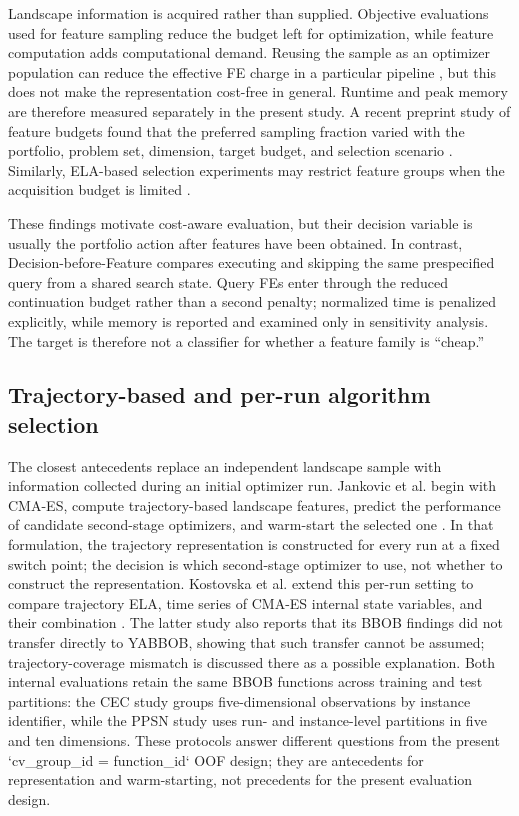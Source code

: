 Landscape information is acquired rather than supplied.  Objective evaluations
used for feature sampling reduce the budget left for optimization, while
feature computation adds computational demand.  Reusing the sample
as an optimizer population can reduce the effective FE charge in a particular
pipeline \cite{kerschkeAutomatedAlgorithmSelection2019}, but this does not make
the representation cost-free in general.  Runtime and peak memory are therefore
measured separately in the present study.  A recent preprint study of feature
budgets found
that the preferred sampling fraction varied with the portfolio, problem set,
dimension, target budget, and selection scenario
\cite{blomInfluenceFeatureComputation2026}.  Similarly, ELA-based selection
experiments may restrict feature groups when the acquisition budget is limited
\cite{guoAutomatedAlgorithmSelection2025}.

These findings motivate cost-aware evaluation, but their decision variable is
usually the portfolio action after features have been obtained.  In contrast,
Decision-before-Feature compares executing and skipping the same prespecified
query from a shared search state.  Query FEs enter through the reduced
continuation budget rather than a second penalty; normalized time is penalized
explicitly, while memory is reported and examined only in sensitivity analysis.
The target is therefore not a classifier for whether a feature family is
``cheap.''

\subsection{Trajectory-based and per-run algorithm selection}

The closest antecedents replace an independent landscape sample with
information collected during an initial optimizer run.  Jankovic et al. begin
with CMA-ES, compute trajectory-based landscape features, predict the
performance of candidate second-stage optimizers, and warm-start the selected
one \cite{jankovicTrajectorybasedAlgorithmSelection2022}.  In that formulation,
the trajectory representation is constructed for every run at a fixed switch
point; the decision is which second-stage optimizer to use, not whether to
construct the representation.  Kostovska et al.
extend this per-run setting to compare trajectory ELA, time series of CMA-ES
internal state variables, and their combination
\cite{kostovskaPerrunAlgorithmSelection2022}.  The latter study also reports
that its BBOB findings did not transfer directly to YABBOB, showing that such
transfer cannot be assumed; trajectory-coverage mismatch is discussed there as
a possible explanation.  Both internal evaluations retain the same BBOB
functions across training and test partitions: the CEC study groups
five-dimensional observations by instance identifier, while the PPSN study uses
run- and instance-level partitions in five and ten dimensions.  These protocols answer different questions from the present `cv_group_id = function_id` OOF design; they are antecedents for representation and warm-starting, not precedents for the present evaluation design.

